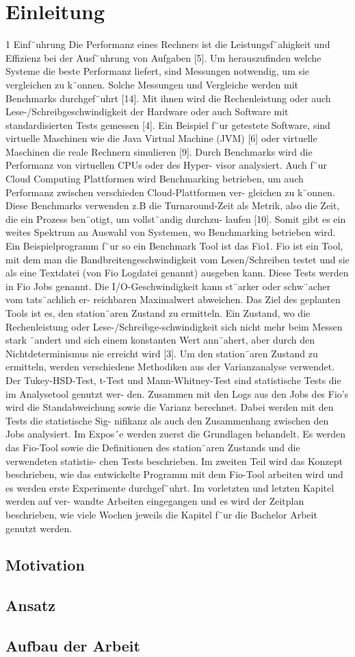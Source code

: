 \chapter{Einleitung}
\label{cha:Einleitung}
1 Einf¨uhrung
Die Performanz eines Rechners ist die Leistungsf¨ahigkeit und Effizienz bei der
Ausf¨uhrung von Aufgaben [5]. Um herauszufinden welche Systeme die beste
Performanz liefert, sind Messungen notwendig, um sie vergleichen zu k¨onnen.
Solche Messungen und Vergleiche werden mit Benchmarks durchgef¨uhrt [14].
Mit ihnen wird die Rechenleistung oder auch Lese-/Schreibgeschwindigkeit der
Hardware oder auch Software mit standardisierten Tests gemessen [4]. Ein
Beispiel f¨ur getestete Software, sind virtuelle Maschinen wie die Java Virtual
Machine (JVM) [6] oder virtuelle Maschinen die reale Rechnern simulieren [9].
Durch Benchmarks wird die Performanz von virtuellen CPUs oder des Hyper-
visor analysiert. Auch f¨ur Cloud Computing Plattformen wird Benchmarking
betrieben, um auch Performanz zwischen verschieden Cloud-Plattformen ver-
gleichen zu k¨onnen. Diese Benchmarks verwenden z.B die Turnaround-Zeit
als Metrik, also die Zeit, die ein Prozess ben¨otigt, um vollst¨andig durchzu-
laufen [10]. Somit gibt es ein weites Spektrum an Auswahl von Systemen, wo
Benchmarking betrieben wird. Ein Beispielprogramm f¨ur so ein Benchmark Tool
ist das Fio1. Fio ist ein Tool, mit dem man die Bandbreitengeschwindigkeit vom
Lesen/Schreiben testet und sie als eine Textdatei (von Fio Logdatei genannt)
ausgeben kann. Diese Tests werden in Fio Jobs genannt.
Die I/O-Geschwindigkeit kann st¨arker oder schw¨acher vom tats¨achlich er-
reichbaren Maximalwert abweichen. Das Ziel des geplanten Tools ist es, den
station¨aren Zustand zu ermitteln. Ein Zustand, wo die Rechenleistung oder
Lese-/Schreibge-schwindigkeit sich nicht mehr beim Messen stark ¨andert und
sich einem konstanten Wert ann¨ahert, aber durch den Nichtdeterminismus nie
erreicht wird [3]. Um den station¨aren Zustand zu ermitteln, werden verschiedene
Methodiken aus der Varianzanalyse verwendet. Der Tukey-HSD-Test, t-Test
und Mann-Whitney-Test sind statistische Tests die im Analysetool genutzt wer-
den. Zusammen mit den Logs aus den Jobs des Fio’s wird die Standabweichung
sowie die Varianz berechnet. Dabei werden mit den Tests die statistische Sig-
nifikanz als auch den Zusammenhang zwischen den Jobs analysiert.
Im Expos´e werden zuerst die Grundlagen behandelt. Es werden das Fio-Tool
sowie die Definitionen des station¨aren Zustands und die verwendeten statistis-
chen Tests beschrieben. Im zweiten Teil wird das Konzept beschrieben, wie
das entwickelte Programm mit dem Fio-Tool arbeiten wird und es werden erste
Experimente durchgef¨uhrt. Im vorletzten und letzten Kapitel werden auf ver-
wandte Arbeiten eingegangen und es wird der Zeitplan beschrieben, wie viele
Wochen jeweils die Kapitel f¨ur die Bachelor Arbeit genutzt werden.
\section{Motivation}
\section{Ansatz}
\section{Aufbau der Arbeit}